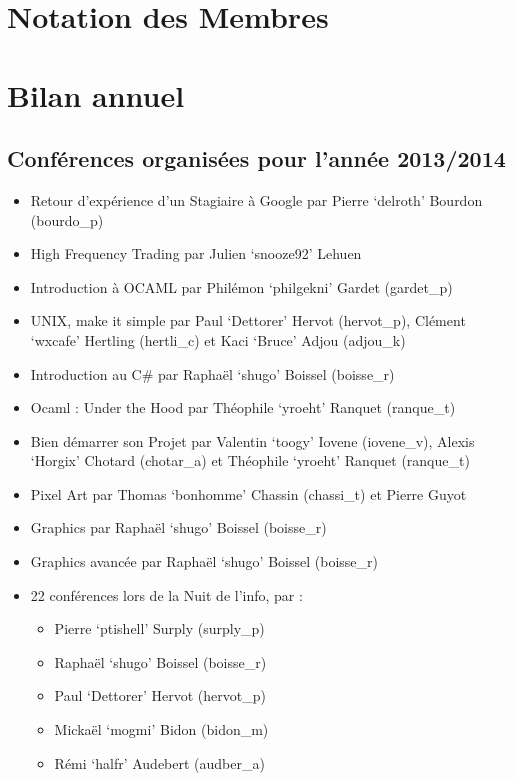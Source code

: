 \documentclass[12pt]{report}
\begin{document}
  \section{Notation des Membres}
  
  \section{Bilan annuel}
  \subsection{Conférences organisées pour l'année 2013/2014}
  \begin{itemize}
    \item Retour d'expérience d'un Stagiaire à Google par Pierre `delroth' Bourdon (bourdo\_p)
    \item High Frequency Trading par Julien `snooze92' Lehuen
    \item Introduction à OCAML par Philémon `philgekni' Gardet (gardet\_p)
    \item UNIX, make it simple par Paul `Dettorer' Hervot (hervot\_p), Clément `wxcafe' Hertling (hertli\_c) et Kaci `Bruce' Adjou (adjou\_k)
    \item Introduction au C\# par Raphaël `shugo' Boissel (boisse\_r)
    \item Ocaml : Under the Hood par Théophile `yroeht' Ranquet (ranque\_t)
    \item Bien démarrer son Projet par Valentin `toogy' Iovene (iovene\_v), Alexis `Horgix' Chotard (chotar\_a) et Théophile `yroeht' Ranquet (ranque\_t)
    \item Pixel Art par Thomas `bonhomme' Chassin (chassi\_t) et Pierre Guyot
    \item Graphics par Raphaël `shugo' Boissel (boisse\_r)
    \item Graphics avancée par Raphaël `shugo' Boissel (boisse\_r)
    \item 22 conférences lors de la Nuit de l'info, par : \\
      \begin{itemize}
        \item Pierre `ptishell' Surply (surply\_p)
        \item Raphaël `shugo' Boissel (boisse\_r)
        \item Paul `Dettorer' Hervot (hervot\_p)
        \item Mickaël `mogmi' Bidon (bidon\_m)
        \item Rémi `halfr' Audebert (audber\_a)

\end{itemize}
\end{itemize}
\end{document}
